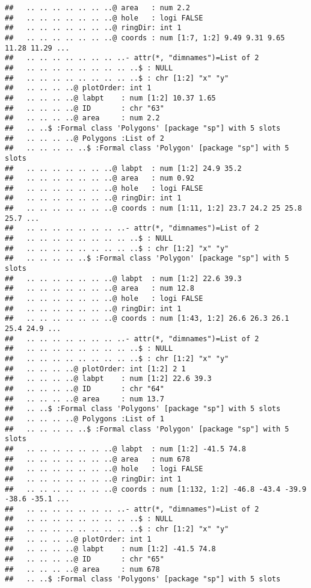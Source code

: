 \documentclass[]{article}
\begin{document}
\begin{verbatim}
##   .. .. .. .. .. .. ..@ area   : num 2.2
##   .. .. .. .. .. .. ..@ hole   : logi FALSE
##   .. .. .. .. .. .. ..@ ringDir: int 1
##   .. .. .. .. .. .. ..@ coords : num [1:7, 1:2] 9.49 9.31 9.65 11.28 11.29 ...
##   .. .. .. .. .. .. .. ..- attr(*, "dimnames")=List of 2
##   .. .. .. .. .. .. .. .. ..$ : NULL
##   .. .. .. .. .. .. .. .. ..$ : chr [1:2] "x" "y"
##   .. .. .. ..@ plotOrder: int 1
##   .. .. .. ..@ labpt    : num [1:2] 10.37 1.65
##   .. .. .. ..@ ID       : chr "63"
##   .. .. .. ..@ area     : num 2.2
##   .. ..$ :Formal class 'Polygons' [package "sp"] with 5 slots
##   .. .. .. ..@ Polygons :List of 2
##   .. .. .. .. ..$ :Formal class 'Polygon' [package "sp"] with 5 slots
##   .. .. .. .. .. .. ..@ labpt  : num [1:2] 24.9 35.2
##   .. .. .. .. .. .. ..@ area   : num 0.92
##   .. .. .. .. .. .. ..@ hole   : logi FALSE
##   .. .. .. .. .. .. ..@ ringDir: int 1
##   .. .. .. .. .. .. ..@ coords : num [1:11, 1:2] 23.7 24.2 25 25.8 25.7 ...
##   .. .. .. .. .. .. .. ..- attr(*, "dimnames")=List of 2
##   .. .. .. .. .. .. .. .. ..$ : NULL
##   .. .. .. .. .. .. .. .. ..$ : chr [1:2] "x" "y"
##   .. .. .. .. ..$ :Formal class 'Polygon' [package "sp"] with 5 slots
##   .. .. .. .. .. .. ..@ labpt  : num [1:2] 22.6 39.3
##   .. .. .. .. .. .. ..@ area   : num 12.8
##   .. .. .. .. .. .. ..@ hole   : logi FALSE
##   .. .. .. .. .. .. ..@ ringDir: int 1
##   .. .. .. .. .. .. ..@ coords : num [1:43, 1:2] 26.6 26.3 26.1 25.4 24.9 ...
##   .. .. .. .. .. .. .. ..- attr(*, "dimnames")=List of 2
##   .. .. .. .. .. .. .. .. ..$ : NULL
##   .. .. .. .. .. .. .. .. ..$ : chr [1:2] "x" "y"
##   .. .. .. ..@ plotOrder: int [1:2] 2 1
##   .. .. .. ..@ labpt    : num [1:2] 22.6 39.3
##   .. .. .. ..@ ID       : chr "64"
##   .. .. .. ..@ area     : num 13.7
##   .. ..$ :Formal class 'Polygons' [package "sp"] with 5 slots
##   .. .. .. ..@ Polygons :List of 1
##   .. .. .. .. ..$ :Formal class 'Polygon' [package "sp"] with 5 slots
##   .. .. .. .. .. .. ..@ labpt  : num [1:2] -41.5 74.8
##   .. .. .. .. .. .. ..@ area   : num 678
##   .. .. .. .. .. .. ..@ hole   : logi FALSE
##   .. .. .. .. .. .. ..@ ringDir: int 1
##   .. .. .. .. .. .. ..@ coords : num [1:132, 1:2] -46.8 -43.4 -39.9 -38.6 -35.1 ...
##   .. .. .. .. .. .. .. ..- attr(*, "dimnames")=List of 2
##   .. .. .. .. .. .. .. .. ..$ : NULL
##   .. .. .. .. .. .. .. .. ..$ : chr [1:2] "x" "y"
##   .. .. .. ..@ plotOrder: int 1
##   .. .. .. ..@ labpt    : num [1:2] -41.5 74.8
##   .. .. .. ..@ ID       : chr "65"
##   .. .. .. ..@ area     : num 678
##   .. ..$ :Formal class 'Polygons' [package "sp"] with 5 slots

\end{verbatim}
\end{document}
